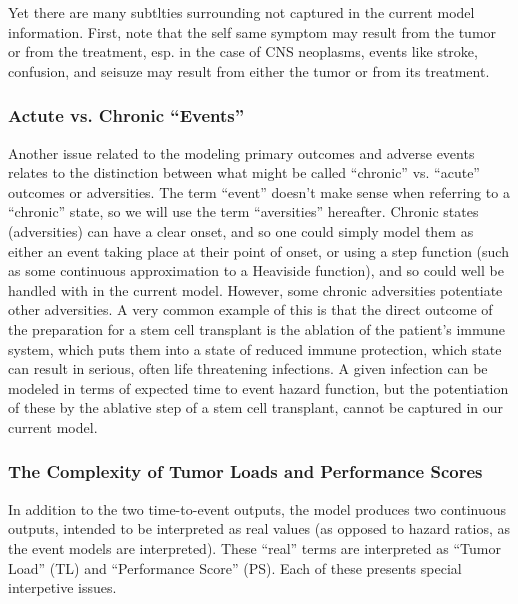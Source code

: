 \documentclass[twocolumn]{bmcart}%
\begin{document}
Yet there are many subtlties surrounding not captured in the current
model information. First, note that the self same symptom may result
from the tumor or from the treatment, esp. in the case of CNS
neoplasms, events like stroke, confusion, and seisuze may result from
either the tumor or from its treatment.

\subsubsection{Actute vs. Chronic ``Events''}\label{sec:model-struct-issues-b}

Another issue related to the modeling primary outcomes and adverse
events relates to the distinction between what might be called
``chronic'' vs. ``acute'' outcomes or adversities. The term ``event''
doesn't make sense when referring to a ``chronic'' state, so we will
use the term ``aversities'' hereafter. Chronic states (adversities)
can have a clear onset, and so one could simply model them as either
an event taking place at their point of onset, or using a step
function (such as some continuous approximation to a Heaviside
function), and so could well be handled with in the current
model. However, some chronic adversities potentiate other
adversities. A very common example of this is that the direct outcome
of the preparation for a stem cell transplant is the ablation of the
patient's immune system, which puts them into a state of reduced
immune protection, which state can result in serious, often life
threatening infections. A given infection can be modeled in terms of
expected time to event hazard function, but the potentiation of these
by the ablative step of a stem cell transplant, cannot be captured 
in our current model.

\subsubsection{The Complexity of Tumor Loads and Performance Scores}\label{sec:model-struct-issues-tlps}

In addition to the two time-to-event outputs, the model produces two
continuous outputs, intended to be interpreted as real values (as
opposed to hazard ratios, as the event models are interpreted). These
``real'' terms are interpreted as ``Tumor Load'' (TL) and
``Performance Score'' (PS). Each of these presents special interpetive
issues.
\end{document}
